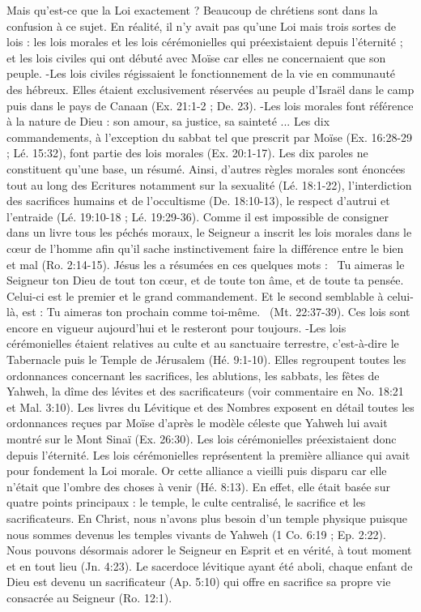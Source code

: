 \begin{multicols}{2}
{Mais qu’est-ce que la Loi exactement ?  Beaucoup de chrétiens sont dans la confusion à ce sujet.  En réalité, il n’y avait pas qu’une Loi mais trois sortes de lois : les  lois  morales et les lois cérémonielles  qui préexistaient depuis l’éternité ; et les lois civiles qui ont débuté avec Moïse car elles ne concernaient que son peuple.
-Les lois civiles régissaient le fonctionnement de la vie en communauté des hébreux. Elles étaient exclusivement réservées au peuple d’Israël dans le camp puis dans le pays de Canaan (Ex. 21:1-2 ; De. 23).
-Les lois morales font référence à la nature de Dieu : son amour, sa justice, sa sainteté ... Les dix commandements, à l’exception du sabbat tel que prescrit par Moïse (Ex. 16:28-29 ; Lé. 15:32), font partie des lois morales (Ex. 20:1-17). Les dix paroles ne constituent qu’une base, un résumé. Ainsi, d’autres règles morales sont énoncées tout au long des Ecritures notamment sur la sexualité (Lé. 18:1-22), l'interdiction des sacrifices humains et de l’occultisme (De. 18:10-13), le respect d’autrui et l’entraide (Lé. 19:10-18 ; Lé. 19:29-36). Comme il est impossible de consigner dans un livre tous les péchés moraux, le Seigneur a inscrit les lois morales dans le cœur de l’homme afin qu’il sache instinctivement faire la différence entre le bien et mal (Ro. 2:14-15). Jésus les a résumées en ces quelques mots : ~Tu aimeras le Seigneur ton Dieu de tout ton cœur, et de toute ton âme, et de toute ta pensée. Celui-ci est le premier et le grand commandement. Et le second semblable à celui-là, est : Tu aimeras ton prochain comme toi-même.~ (Mt. 22:37-39). Ces lois sont encore en vigueur aujourd’hui et le resteront pour toujours.
-Les lois cérémonielles étaient relatives au culte  et au sanctuaire terrestre, c’est-à-dire le Tabernacle puis le Temple de Jérusalem (Hé. 9:1-10). Elles regroupent toutes les ordonnances concernant les sacrifices, les ablutions, les sabbats, les fêtes de Yahweh, la dîme des lévites et des sacrificateurs (voir commentaire en No. 18:21 et Mal. 3:10). Les livres du Lévitique et des Nombres exposent en détail toutes les ordonnances reçues par Moïse d’après le modèle céleste que Yahweh lui avait montré  sur le Mont Sinaï (Ex. 26:30).  Les lois cérémonielles préexistaient donc depuis l’éternité.
Les lois cérémonielles représentent la première alliance qui avait pour fondement la Loi morale. Or cette alliance a vieilli puis disparu car elle n’était que l’ombre des choses à venir (Hé. 8:13). En effet, elle était basée sur quatre points principaux : le temple, le culte centralisé, le sacrifice et les sacrificateurs. En Christ, nous n’avons plus besoin d’un temple physique puisque nous sommes devenus les temples vivants  de Yahweh (1 Co. 6:19 ; Ep. 2:22). Nous pouvons désormais adorer le Seigneur en Esprit et en vérité, à tout moment et en tout lieu (Jn. 4:23). Le sacerdoce lévitique ayant été aboli, chaque enfant de Dieu est devenu un sacrificateur (Ap. 5:10) qui offre en sacrifice sa propre vie consacrée au Seigneur (Ro. 12:1).
}
\end{multicols}
